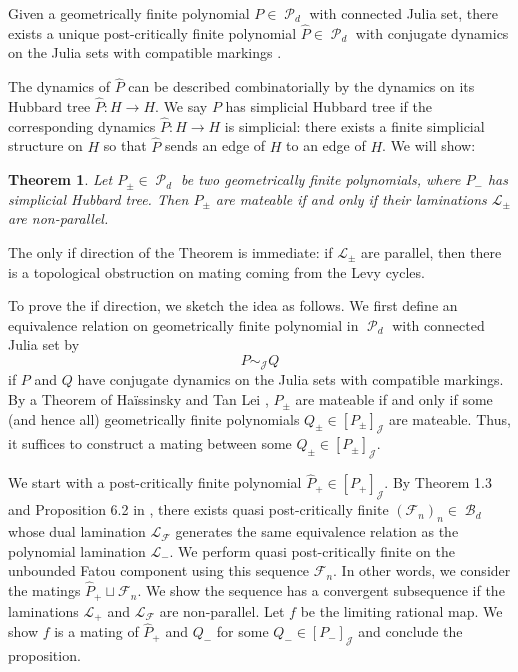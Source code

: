 \documentclass[11pt, reqno]{amsart}
\numberwithin{equation}{section}
\theoremstyle{plain}
\newtheorem{theorem}{Theorem}[section]
\theoremstyle{theorem}
\theoremstyle{definition}
\newcommand{\bp}{\mathcal{F}}
\DeclareMathOperator{\BP}{\mathcal{B}}
\DeclareMathOperator{\MP}{\mathcal{P}}
\numberwithin{figure}{section}
\begin{document}
Given a geometrically finite polynomial $P \in \MP_d$ with connected Julia set, there exists a unique post-critically finite polynomial $\hat P \in \MP_d$ with conjugate dynamics on the Julia sets with compatible markings \cite{Haissinsky00}.

The dynamics of $\hat P$ can be described combinatorially by the dynamics on its Hubbard tree $\hat P: H \rightarrow H$.
We say $P$ has simplicial Hubbard tree if the corresponding dynamics $\hat P: H \rightarrow H$ is simplicial: there exists a finite simplicial structure on $H$ so that $\hat P$ sends an edge of $H$ to an edge of $H$.
We will show:
\begin{theorem}\label{thm:mating}
Let $P_\pm \in \MP_d$ be two geometrically finite polynomials, where $P_-$ has simplicial Hubbard tree.
Then $P_\pm$ are mateable if and only if their laminations $\mathcal{L}_\pm$ are non-parallel.
\end{theorem}

The only if direction of the Theorem is immediate: if $\mathcal{L}_\pm$ are parallel, then there is a topological obstruction on mating coming from the Levy cycles.

To prove the if direction, we sketch the idea as follows.
We first define an equivalence relation on geometrically finite polynomial in $\MP_d$ with connected Julia set by
$$
P \sim_\mathcal{J} Q
$$
if $P$ and $Q$ have conjugate dynamics on the Julia sets with compatible markings.
By a Theorem of Ha\"issinsky and Tan Lei \cite{HT04}, $P_\pm$ are mateable if and only if some (and hence all) geometrically finite polynomials $Q_\pm \in [P_\pm]_\mathcal{J}$ are mateable.
Thus, it suffices to construct a mating between some $Q_\pm \in [P_\pm]_\mathcal{J}$.

We start with a post-critically finite polynomial $\hat P_+ \in [P_+]_\mathcal{J}$.
By Theorem 1.3 and Proposition 6.2 in \cite{Luo21}, there exists quasi post-critically finite $(\bp_n)_n \in \BP_d$ whose dual lamination $\mathcal{L}_\bp$ generates the same equivalence relation as the polynomial lamination $\mathcal{L}_-$.
We perform quasi post-critically finite on the unbounded Fatou component using this sequence $\bp_n$. 
In other words, we consider the matings $\hat P_+ \sqcup \bp_n$.
We show the sequence has a convergent subsequence if the laminations $\mathcal{L}_+$ and $\mathcal{L}_{\bp}$ are non-parallel.
Let $f$ be the limiting rational map.
We show $f$ is a mating of $\hat P_+$ and $Q_-$ for some $Q_- \in [P_-]_\mathcal{J}$ and conclude the proposition.
\end{document}
